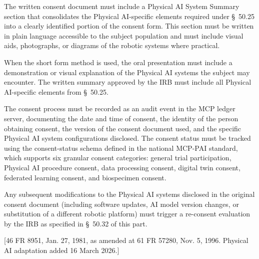 \documentclass[11pt]{article}
\begin{document}
\begin{description}[leftmargin=1.0cm,style=sameline]
\item[(1)] The written consent document must include a Physical AI System Summary section that consolidates the Physical AI-specific elements required under \S~50.25 into a clearly identified portion of the consent form. This section must be written in plain language accessible to the subject population and must include visual aids, photographs, or diagrams of the robotic systems where practical.
\item[(2)] When the short form method is used, the oral presentation must include a demonstration or visual explanation of the Physical AI systems the subject may encounter. The written summary approved by the IRB must include all Physical AI-specific elements from \S~50.25.
\item[(3)] The consent process must be recorded as an audit event in the MCP ledger server, documenting the date and time of consent, the identity of the person obtaining consent, the version of the consent document used, and the specific Physical AI system configurations disclosed. The consent status must be tracked using the consent-status schema defined in the national MCP-PAI standard, which supports six granular consent categories: general trial participation, Physical AI procedure consent, data processing consent, digital twin consent, federated learning consent, and biospecimen consent.
\item[(4)] Any subsequent modifications to the Physical AI systems disclosed in the original consent document (including software updates, AI model version changes, or substitution of a different robotic platform) must trigger a re-consent evaluation by the IRB as specified in \S~50.32 of this part.
\end{description}

[46 FR 8951, Jan. 27, 1981, as amended at 61 FR 57280, Nov. 5, 1996. Physical AI adaptation added 16 March 2026.]
\end{document}
